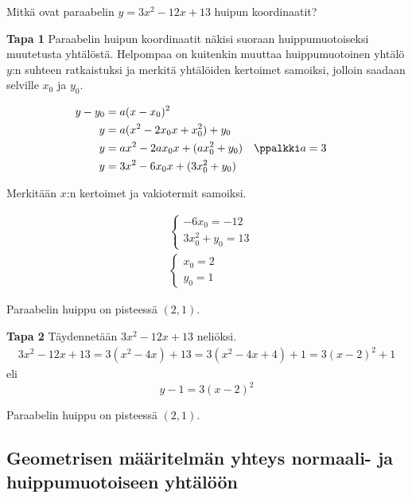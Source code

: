 \begin{esimerkki}
	Mitkä ovat paraabelin $y=3x^2-12x+13$ huipun koordinaatit?
	\begin{esimratk} \textbf{Tapa 1}
		Paraabelin huipun koordinaatit näkisi suoraan huippumuotoiseksi muutetusta yhtälöstä. Helpompaa on kuitenkin muuttaa huippumuotoinen yhtälö $y$:n suhteen ratkaistuksi ja merkitä yhtälöiden kertoimet samoiksi, jolloin saadaan selville $x_0$ ja $y_0$.

		\begin{align*}
			y-y_0	&= a(x-x_0)^2 \\
			y       &= a(x^2-2x_0x+x_0^2)+y_0\\
			y       &= ax^2-2ax_0x+(ax_0^2+y_0) &&\ppalkki a=3\\
			y       &= 3x^2-6x_0x+(3x_0^2+y_0)
		\end{align*}

		Merkitään $x$:n kertoimet ja vakiotermit samoiksi.

		\begin{align*}
			&\begin{cases}
				-6x_0=-12 \\
				3x_0^2+y_0 =13
			\end{cases}\\
			&\begin{cases}
				x_0=2 \\
				y_0 =1
			\end{cases}
		\end{align*}
		\begin{esimvast}
			Paraabelin huippu on pisteessä $(2, 1)$.
		\end{esimvast}

		\begin{esimratk} \textbf{Tapa 2}
			Täydennetään $3x^2-12x+13$ neliöksi.
			\begin{align*}
				3x^2-12x+13 = 3(x^2-4x)+13 = 3(x^2-4x+4)+1 = 3(x-2)^2+1
			\end{align*}
			eli
			\[ y-1 = 3(x-2)^2 \]
			\begin{esimvast}
			Paraabelin huippu on pisteessä $(2, 1)$.
\end{esimvast}
\end{esimratk}

\end{esimratk}
\end{esimerkki}

\subsection{Geometrisen määritelmän yhteys normaali- ja huippumuotoiseen yhtälöön}

